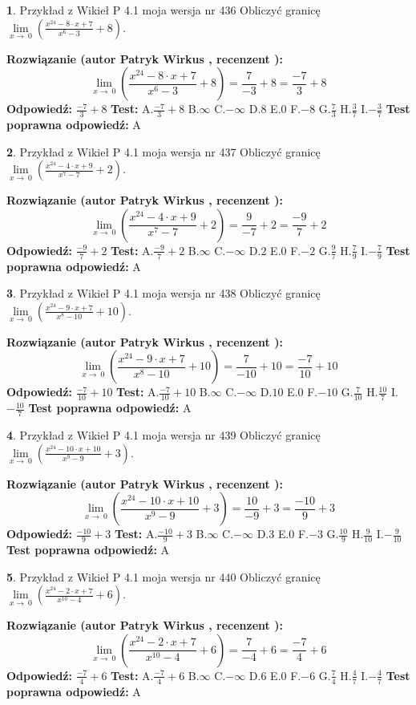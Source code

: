 \documentclass[12pt, a4paper]{article}
\theoremstyle{definition} %
\newtheorem{zad}{}
\newcommand{\zadStart}[1]{\begin{zad}#1\newline}
\newcommand{\zadStop}{\end{zad}}
\newcommand{\rozwStart}[2]{\noindent \textbf{Rozwiązanie (autor #1 , recenzent #2): }\newline}
\newcommand{\rozwStop}{\newline}
\newcommand{\odpStart}{\noindent \textbf{Odpowiedź:}\newline}
\newcommand{\odpStop}{\newline}
\newcommand{\testStart}{\noindent \textbf{Test:}\newline}
\newcommand{\testStop}{\newline}
\newcommand{\kluczStart}{\noindent \textbf{Test poprawna odpowiedź:}\newline}
\newcommand{\kluczStop}{\newline}
\begin{document}
\zadStart{Przykład z Wikieł P 4.1 moja wersja nr 436}
Obliczyć granicę $\lim\limits_{x\to\ 0}(\frac{x^{24}-8 \cdot x +7}{x^{6}-3}+8)$.
\zadStop
\rozwStart{Patryk Wirkus}{}
$$\lim\limits_{x\to\ 0}(\frac{x^{24}-8 \cdot x +7}{x^{6}-3}+8)=\frac{7}{-3}+8=\frac{-7}{3}+8$$
\rozwStop
\odpStart
$\frac{-7}{3}+8$
\odpStop
\testStart
A.$\frac{-7}{3}+8$
B.$\infty$
C.$-\infty$
D.$8$
E.$0$
F.$-8$
G.$\frac{7}{3}$
H.$\frac{3}{7}$
I.$-\frac{3}{7}$
\testStop
\kluczStart
A
\kluczStop



\zadStart{Przykład z Wikieł P 4.1 moja wersja nr 437}
Obliczyć granicę $\lim\limits_{x\to\ 0}(\frac{x^{24}-4 \cdot x +9}{x^{7}-7}+2)$.
\zadStop
\rozwStart{Patryk Wirkus}{}
$$\lim\limits_{x\to\ 0}(\frac{x^{24}-4 \cdot x +9}{x^{7}-7}+2)=\frac{9}{-7}+2=\frac{-9}{7}+2$$
\rozwStop
\odpStart
$\frac{-9}{7}+2$
\odpStop
\testStart
A.$\frac{-9}{7}+2$
B.$\infty$
C.$-\infty$
D.$2$
E.$0$
F.$-2$
G.$\frac{9}{7}$
H.$\frac{7}{9}$
I.$-\frac{7}{9}$
\testStop
\kluczStart
A
\kluczStop



\zadStart{Przykład z Wikieł P 4.1 moja wersja nr 438}
Obliczyć granicę $\lim\limits_{x\to\ 0}(\frac{x^{24}-9 \cdot x +7}{x^{8}-10}+10)$.
\zadStop
\rozwStart{Patryk Wirkus}{}
$$\lim\limits_{x\to\ 0}(\frac{x^{24}-9 \cdot x +7}{x^{8}-10}+10)=\frac{7}{-10}+10=\frac{-7}{10}+10$$
\rozwStop
\odpStart
$\frac{-7}{10}+10$
\odpStop
\testStart
A.$\frac{-7}{10}+10$
B.$\infty$
C.$-\infty$
D.$10$
E.$0$
F.$-10$
G.$\frac{7}{10}$
H.$\frac{10}{7}$
I.$-\frac{10}{7}$
\testStop
\kluczStart
A
\kluczStop



\zadStart{Przykład z Wikieł P 4.1 moja wersja nr 439}
Obliczyć granicę $\lim\limits_{x\to\ 0}(\frac{x^{24}-10 \cdot x +10}{x^{9}-9}+3)$.
\zadStop
\rozwStart{Patryk Wirkus}{}
$$\lim\limits_{x\to\ 0}(\frac{x^{24}-10 \cdot x +10}{x^{9}-9}+3)=\frac{10}{-9}+3=\frac{-10}{9}+3$$
\rozwStop
\odpStart
$\frac{-10}{9}+3$
\odpStop
\testStart
A.$\frac{-10}{9}+3$
B.$\infty$
C.$-\infty$
D.$3$
E.$0$
F.$-3$
G.$\frac{10}{9}$
H.$\frac{9}{10}$
I.$-\frac{9}{10}$
\testStop
\kluczStart
A
\kluczStop



\zadStart{Przykład z Wikieł P 4.1 moja wersja nr 440}
Obliczyć granicę $\lim\limits_{x\to\ 0}(\frac{x^{24}-2 \cdot x +7}{x^{10}-4}+6)$.
\zadStop
\rozwStart{Patryk Wirkus}{}
$$\lim\limits_{x\to\ 0}(\frac{x^{24}-2 \cdot x +7}{x^{10}-4}+6)=\frac{7}{-4}+6=\frac{-7}{4}+6$$
\rozwStop
\odpStart
$\frac{-7}{4}+6$
\odpStop
\testStart
A.$\frac{-7}{4}+6$
B.$\infty$
C.$-\infty$
D.$6$
E.$0$
F.$-6$
G.$\frac{7}{4}$
H.$\frac{4}{7}$
I.$-\frac{4}{7}$
\testStop
\kluczStart
A
\kluczStop
\end{document}

